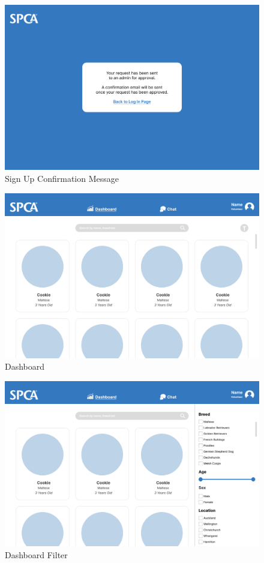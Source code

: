 \begin{figure}[h]
\centering
\includegraphics[width=\textwidth]{proposal/parts/sign-up-confirm.png}
\caption{Sign Up Confirmation Message}
\label{figure:sign up message}
\end{figure}

\begin{figure}[h]
\centering
\includegraphics[width=\textwidth]{proposal/parts/dashboard.png}
\caption{Dashboard}
\label{figure:dashboard}
\end{figure}

\begin{figure}[h]
\centering
\includegraphics[width=\textwidth]{proposal/parts/dashboard-filter.png}
\caption{Dashboard Filter}
\label{figure:dashboard filter}
\end{figure}

